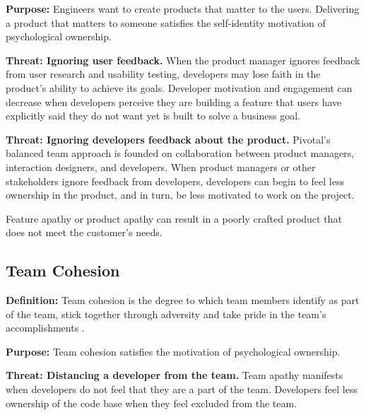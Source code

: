 \textbf{Purpose:} Engineers want to create products that matter to the users. Delivering a product that matters to someone satisfies the self-identity motivation of psychological ownership.

\textbf{Threat: Ignoring user feedback.} When the product manager ignores feedback from user research and usability testing, developers may lose faith in the product's ability to achieve its goals. Developer motivation and engagement can decrease when developers perceive they are building a feature that users have explicitly said they do not want yet is built to solve a business goal. 

\textbf{Threat: Ignoring developers feedback about the product.} Pivotal's balanced team approach is founded on collaboration between product managers, interaction designers, and developers. When product managers or other stakeholders ignore feedback from developers, developers can begin to feel less ownership in the product, and in turn, be less motivated to work on the project. 


Feature apathy or product apathy can result in a poorly crafted product that does not meet the customer's needs.

\subsection{Team Cohesion}
\textbf{Definition:} Team cohesion is the degree to which team members identify as part of the team, stick together through adversity and take pride in the team's accomplishments \cite{Bollen1990Perceived, Beal2003Cohesion, Whitworth2007Motivation}.

\textbf{Purpose:} Team cohesion satisfies the  motivation of psychological ownership.

\textbf{Threat: Distancing a developer from the team.} Team apathy manifests when developers do not feel that they are a part of the team. Developers feel less ownership of the code base when they feel excluded from the team.

